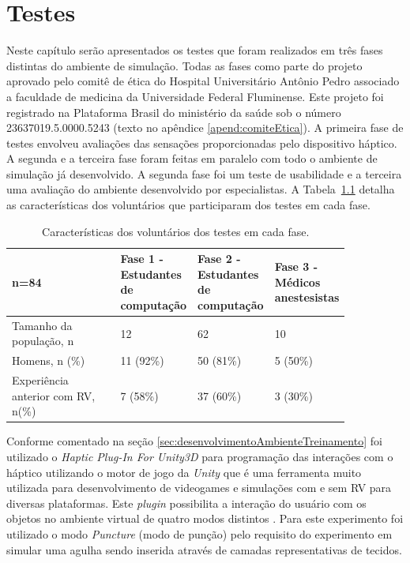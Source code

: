 \chapter{Testes} \label{cap:cap5}

Neste capítulo serão apresentados os testes que foram realizados em três fases distintas do ambiente de simulação. Todas as fases como parte do projeto aprovado pelo comitê de ética do Hospital Universitário Antônio Pedro associado a faculdade de medicina da Universidade Federal Fluminense. Este projeto foi registrado na Plataforma Brasil do ministério da saúde sob o número 23637019.5.0000.5243 (texto no apêndice \ref{apend:comiteEtica}). A primeira fase de testes envolveu avaliações das sensações proporcionadas pelo dispositivo háptico. A segunda e a terceira fase foram feitas em paralelo com todo o ambiente de simulação já desenvolvido. A segunda fase foi um teste de usabilidade e a terceira uma avaliação do ambiente desenvolvido por especialistas.
A Tabela~\ref{tab:tabelaCaracteristicasVoluntarios} detalha as características dos voluntários que participaram dos testes em cada fase.

\begin{table}[!ht]
\begin{center}
\caption{Características dos voluntários dos testes em cada fase.}
\label{tab:tabelaCaracteristicasVoluntarios}
\begin{tabular}{|p{0.4\linewidth}|p{0.15\linewidth}|p{0.15\linewidth}|p{0.15\linewidth}|}
\hline
\textbf{n=84} & \textbf{Fase 1 - Estudantes de computação} & \textbf{Fase 2 - Estudantes de computação} & \textbf{Fase 3 - Médicos anestesistas}\\
\hline\hline
Tamanho da população, n & 12 & 62 & 10\\
Homens, n (\%) & 11 (92\%) & 50 (81\%) &  5 (50\%)\\
Experiência anterior com RV, n(\%) & 7 (58\%)  & 37 (60\%) & 3 (30\%) \\
\hline
\end{tabular}
\end{center}
\end{table}

Conforme comentado na seção \ref{sec:desenvolvimentoAmbienteTreinamento} foi utilizado o \textit{Haptic Plug-In For Unity3D} para programação das interações com o háptico utilizando o motor de jogo da \textit{Unity} \cite{UnityTechnologies2020} que é uma ferramenta muito utilizada para desenvolvimento de videogames e simulações com e sem \acrshort{RV} para diversas plataformas.
Este \textit{plugin} possibilita a interação do usuário com os objetos no ambiente virtual  de quatro modos distintos \cite{Poyade2014}. Para este experimento foi utilizado o modo \textit{Puncture} (modo de punção) pelo requisito do experimento em simular uma agulha sendo inserida através de camadas representativas de tecidos.

